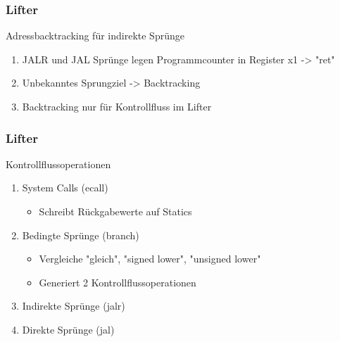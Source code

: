 
\begin{frame}
    \frametitle{Lifter}{Adressbacktracking für indirekte Sprünge}

    \begin{enumerate}
        \setlength\itemsep{0.5em}
        \item JALR und JAL Sprünge legen Programmcounter in Register x1 -> "ret"
        \item Unbekanntes Sprungziel -> Backtracking
        \item Backtracking nur für Kontrollfluss im Lifter
    \end{enumerate}
\end{frame}
\clearpage

\note[itemize]{

}


\begin{frame}
    \frametitle{Lifter}{Kontrollflussoperationen}

    \begin{enumerate}
        \setlength\itemsep{0.5em}
        \item System Calls (ecall)
        \begin{itemize}
            \item Schreibt Rückgabewerte auf Statics
        \end{itemize}
        \item Bedingte Sprünge (branch)
        \begin{itemize}
            \item Vergleiche "gleich", "signed lower", "unsigned lower"
            \item Generiert 2 Kontrollflussoperationen
        \end{itemize}
        \item Indirekte Sprünge (jalr)
        \item Direkte Sprünge (jal)
    \end{enumerate}
\end{frame}
\clearpage

\note[itemize]{

}



